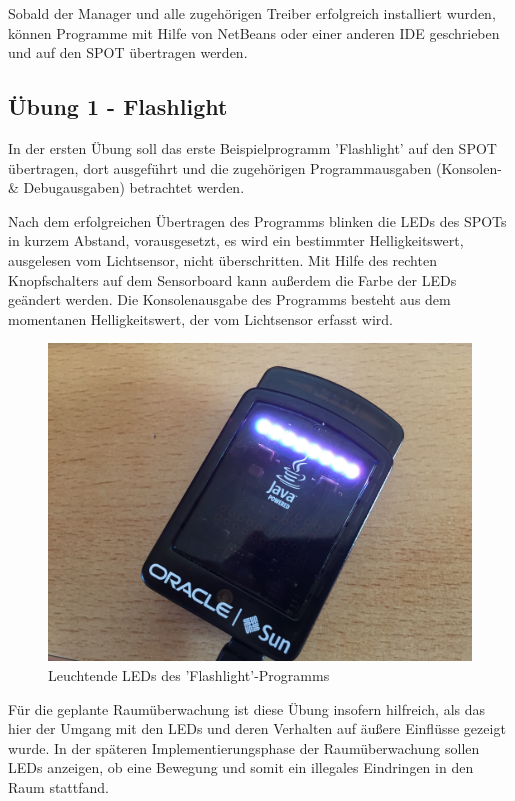 Sobald der Manager und alle zugehörigen Treiber erfolgreich installiert wurden, können Programme mit Hilfe von NetBeans oder einer anderen IDE geschrieben und auf den SPOT übertragen werden.

\subsection{Übung 1 - Flashlight}\label{s:Uebung1}

In der ersten Übung soll das erste Beispielprogramm 'Flashlight' auf den SPOT übertragen, dort ausgeführt und die zugehörigen Programmausgaben (Konsolen- \& Debugausgaben) betrachtet werden. 

Nach dem erfolgreichen Übertragen des Programms blinken die LEDs des SPOTs in kurzem Abstand, vorausgesetzt, es wird ein bestimmter Helligkeitswert, ausgelesen vom Lichtsensor, nicht überschritten. Mit Hilfe des rechten Knopfschalters auf dem Sensorboard kann außerdem die Farbe der LEDs geändert werden. Die Konsolenausgabe des Programms besteht aus dem momentanen Helligkeitswert, der vom Lichtsensor erfasst wird.

\begin{figure}[H] 
	\centering
	\includegraphics[scale=0.08]{Bilder/uebung1}
	\caption{Leuchtende LEDs des 'Flashlight'-Programms}
	\label{f:uebung1}
\end{figure}

Für die geplante Raumüberwachung ist diese Übung insofern hilfreich, als das hier der Umgang mit den LEDs und deren Verhalten auf äußere Einflüsse gezeigt wurde. In der späteren Implementierungsphase der Raumüberwachung sollen LEDs anzeigen, ob eine Bewegung und somit ein illegales Eindringen in den Raum stattfand.

